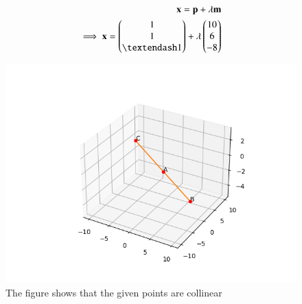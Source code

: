 \documentclass[A4,10pt,twocolumn]{IEEEtran}
\begin{document}
\begin{align}
\vec{x}=\vec{p}+  \lambda \vec{m}\\
\implies \vec{x}= \myvec{1\\1\\– 1} + \lambda \myvec{10\\6\\-8}
\end{align}
\begin{figure}[h!]
  \centering
   \includegraphics[width=\columnwidth]{figs/collinear_points.png}
    \caption{The figure shows that the given points are collinear}
     \label{fig:1}
     \end{figure}
\end{document}
